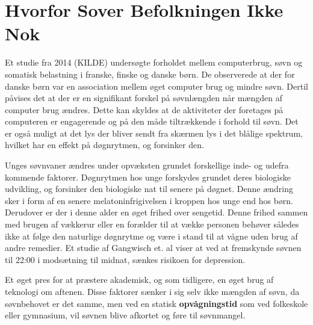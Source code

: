 \section{Hvorfor Sover Befolkningen Ikke Nok}
\label{sec:hvorforSoverBefolkningenIkkeNok}



Et studie fra 2014 (KILDE) undersøgte forholdet mellem computerbrug, søvn og somatisk belastning i franske, finske og danske børn. De observerede at der for danske børn var en association mellem øget computer brug og mindre søvn. Dertil påvises det at der er en signifikant forskel på søvnlængden når mængden af computer brug ændres. Dette kan skyldes at de aktiviteter der foretages på computeren er engagerende og på den måde tiltrækkende i forhold til søvn. Det er også muligt at det lys der bliver sendt fra skærmen lys i det blålige spektrum, hvilket har en effekt på døgnrytmen, og forsinker den. \cite{Carskadon2011}

Unges søvnvaner ændres under opvæksten grundet forskellige inde- og udefra kommende faktorer. Døgnrytmen hos unge forskydes grundet deres biologiske udvikling, og forsinker den biologiske nat til senere på døgnet. Denne ændring sker i form af en senere melatoninfrigivelsen i kroppen hos unge end hos børn. Derudover er der i denne alder en øget frihed over sengetid. Denne frihed sammen med brugen af vækkerur eller en forælder til at vække personen behøver således ikke at følge den naturlige døgnrytme og være i stand til at vågne uden brug af andre remedier. Et studie af Gangwisch et. al \cite{Gangwisch2010} viser at ved at fremskynde søvnen til 22:00 i modsætning til midnat, sænkes risikoen for depression. \cite{Carskadon2011}

Et øget pres for at præstere akademisk, og som tidligere, en øget brug af teknologi om aftenen. Disse faktorer sænker i sig selv ikke mængden af søvn, da søvnbehovet er det samme, men ved en statisk \textbf{opvågningstid} som ved folkeskole eller gymnasium, vil søvnen blive afkortet og føre til søvnmangel. 

 




